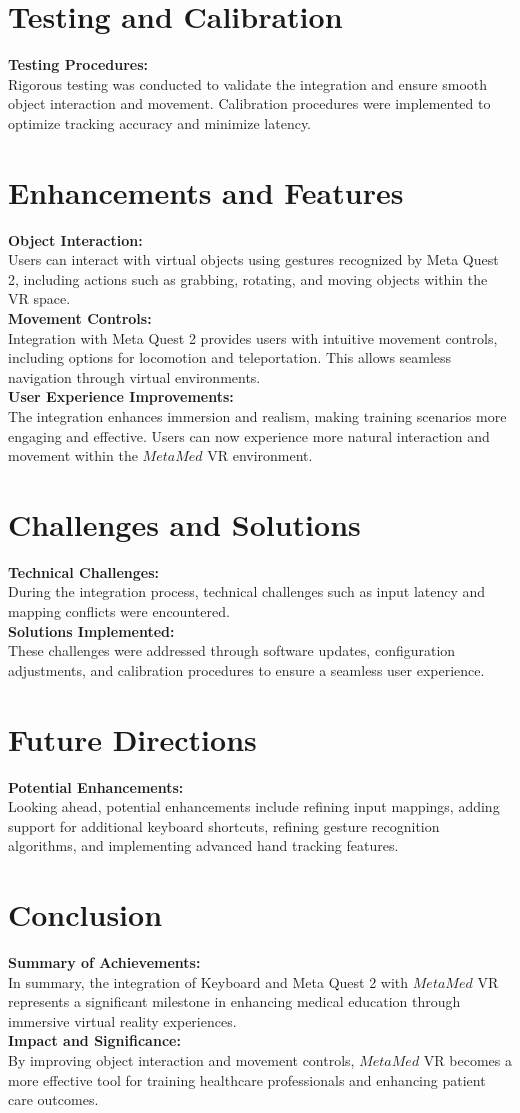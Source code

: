 \section{Testing and Calibration}
\textbf{Testing Procedures:}\\
Rigorous testing was conducted to validate the integration and ensure smooth object interaction and movement. Calibration procedures were implemented to optimize tracking accuracy and minimize latency.
\section{Enhancements and Features}
\textbf{Object Interaction:}\\
Users can interact with virtual objects using gestures recognized by Meta Quest 2, including actions such as grabbing, rotating, and moving objects within the VR space.\\
\textbf{Movement Controls:}\\
Integration with Meta Quest 2 provides users with intuitive movement controls, including options for locomotion and teleportation. This allows seamless navigation through virtual environments.\\
\textbf{User Experience Improvements:}\\
The integration enhances immersion and realism, making training scenarios more engaging and effective. Users can now experience more natural interaction and movement within the $MetaMed$ VR environment.
\section{Challenges and Solutions}
\textbf{Technical Challenges:}\\
During the integration process, technical challenges such as input latency and mapping conflicts were encountered.\\
\textbf{Solutions Implemented:}\\
These challenges were addressed through software updates, configuration adjustments, and calibration procedures to ensure a seamless user experience.
\section{Future Directions}
\textbf{Potential Enhancements:}\\
Looking ahead, potential enhancements include refining input mappings, adding support for additional keyboard shortcuts, refining gesture recognition algorithms, and implementing advanced hand tracking features.
\section{Conclusion}
\textbf{Summary of Achievements:}\\
In summary, the integration of Keyboard and Meta Quest 2 with $MetaMed$ VR represents a significant milestone in enhancing medical education through immersive virtual reality experiences.\\
\textbf{Impact and Significance:}\\
By improving object interaction and movement controls, $MetaMed$ VR becomes a more effective tool for training healthcare professionals and enhancing patient care outcomes.
